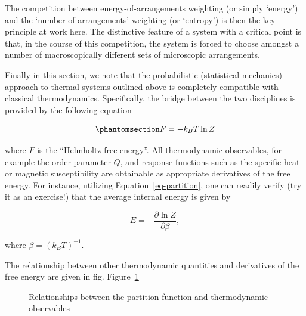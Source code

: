 \documentclass[
  letterpaper,
  enabledeprecatedfontcommands]{report}
\begin{document}
The competition between energy-of-arrangements weighting (or simply
`energy') and the `number of arrangements' weighting (or `entropy') is
then the key principle at work here. The distinctive feature of a system
with a critical point is that, in the course of this competition, the
system is forced to choose amongst a number of macroscopically different
sets of microscopic arrangements.

Finally in this section, we note that the probabilistic (statistical
mechanics) approach to thermal systems outlined above is completely
compatible with classical thermodynamics. Specifically, the bridge
between the two disciplines is provided by the following equation

\begin{equation}\phantomsection\label{eq-free}{
F=-k_BT \ln Z
}\end{equation}

where \(F\) is the ``Helmholtz free energy''. All thermodynamic
observables, for example the order parameter \(Q\), and response
functions such as the specific heat or magnetic susceptibility are
obtainable as appropriate derivatives of the free energy. For instance,
utilizing Equation~\ref{eq-partition}, one can readily verify (try it as
an exercise!) that the average internal energy is given by

\[\overline{E}=-\frac{\partial \ln Z}{\partial \beta},\]

where \(\beta=(k_BT)^{-1}\).

The relationship between other thermodynamic quantities and derivatives
of the free energy are given in fig. Figure~\ref{fig-thermo}

\begin{figure}


\caption{\label{fig-thermo}Relationships between the partition function
and thermodynamic observables}

\end{figure}%
\end{document}
